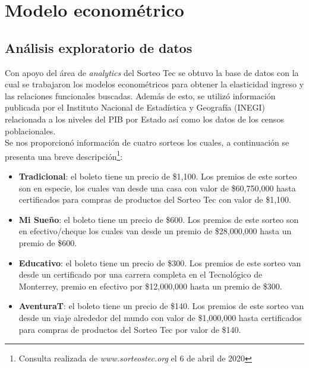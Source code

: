 \chapter{Modelo econométrico}


\newpage

\section{Análisis exploratorio de datos}

\noindent Con apoyo del área de \textit{analytics} del Sorteo Tec se obtuvo la base de datos con la cual se trabajaron los modelos econométricos para obtener la elasticidad ingreso y las relaciones funcionales buscadas. Además de esto, se utilizó información publicada por el Instituto Nacional de Estadística y Geografía (INEGI) relacionada a los niveles del PIB por Estado así como los datos de los censos poblacionales. \\

Se nos proporcionó información de cuatro sorteos los cuales, a continuación se presenta una breve descripción\footnote{Consulta realizada de \textit{www.sorteostec.org} el 6 de abril de 2020}: 

\begin{itemize}
    \item \textbf{Tradicional}: el boleto tiene un precio de \$1,100. Los premios de este sorteo son en especie, los cuales van desde una casa con valor de \$60,750,000 hasta certificados para compras de productos del Sorteo Tec con valor de \$1,100.
    
    \item \textbf{Mi Sueño}: el boleto tiene un precio de \$600. Los premios de este sorteo son en efectivo/cheque los cuales van desde un premio de \$28,000,000 hasta un premio de \$600.
    
    \item \textbf{Educativo}: el boleto tiene un precio de \$300. Los premios de este sorteo van desde un certificado por una carrera completa en el Tecnológico de Monterrey, premio en efectivo por \$12,000,000 hasta un premio de \$300.
    
    \item \textbf{AventuraT}: el boleto tiene un precio de \$140. Los premios de este sorteo van desde un viaje alrededor del mundo con valor de \$1,000,000 hasta certificados para compras de productos del Sorteo Tec por valor de \$140.
    
\end{itemize}

